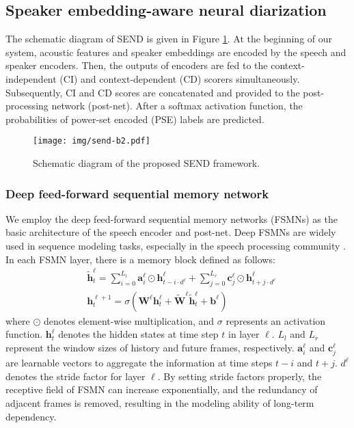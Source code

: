 \documentclass[a4paper]{article}
\begin{document}
\subsection{Speaker embedding-aware neural diarization}
The schematic diagram of SEND is given in Figure \ref{fig:send}.
At the beginning of our system, acoustic features and speaker embeddings are encoded by the speech and speaker encoders.
Then, the outputs of encoders are fed to the context-independent (CI) and context-dependent (CD) scorers simultaneously.
Subsequently, CI and CD scores are concatenated and provided to the post-processing network (post-net).
After a softmax activation function, the probabilities of power-set encoded (PSE) labels are predicted.
\begin{figure}[t!]
	\centering
	\texttt{[image: img/send-b2.pdf]}
	\caption{Schematic diagram of the proposed SEND framework.}
	\label{fig:send}
\end{figure}
\subsubsection{Deep feed-forward sequential memory network}
We employ the deep feed-forward sequential memory networks (FSMNs) \cite{zhang2015fsmn} as the basic architecture of the speech encoder and post-net.
Deep FSMNs are widely used in sequence modeling tasks, especially in the speech processing community \cite{BiLZLY18, ZhangLYD18,ZhangLLL19a}.
In each FSMN layer, there is a memory block defined as follows:
\begin{equation}
\begin{split}
	&\tilde{\mathbf{h}}^\ell_t =\sum_{i=0}^{L_l}\mathbf{a}_i^\ell\odot \mathbf{h}^\ell_{t-i\cdot d^\ell} + \sum_{j=0}^{L_r}\mathbf{c}_j^\ell\odot \mathbf{h}^\ell_{t+j\cdot d^\ell} \\
	&\mathbf{h}^{\ell+1}_t =\sigma(\mathbf{W}^\ell\mathbf{h}_t^\ell + \tilde{\mathbf{W}}^\ell\tilde{\mathbf{h}}^\ell_t + \mathbf{b}^\ell)
\end{split}
\end{equation}
where $\odot$ denotes element-wise multiplication, and $\sigma$ represents an activation function.
$\mathbf{h}^\ell_t$ denotes the hidden states at time step $t$ in layer $\ell$. 
$L_l$ and $L_r$ represent the window sizes of history and future frames, respectively.
$\mathbf{a}_i^\ell$ and $\mathbf{c}_j^\ell$ are learnable vectors to aggregate the information at time steps $t-i$ and $t+j$. $d^\ell$ denotes the stride factor for layer $\ell$.
By setting stride factors properly, the receptive field of FSMN can increase exponentially, and the redundancy of adjacent frames is removed, resulting in the modeling ability of long-term dependency.
\end{document}
